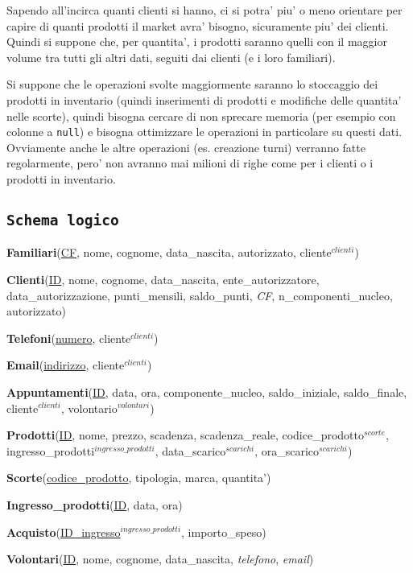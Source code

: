 \documentclass[]{article}
\begin{document}
Sapendo all'incirca quanti clienti si hanno, ci si potra' piu' o meno
orientare per capire di quanti prodotti il market avra' bisogno,
sicuramente piu' dei clienti. Quindi si suppone che, per quantita', i
prodotti saranno quelli con il maggior volume tra tutti gli altri dati,
seguiti dai clienti (e i loro familiari).

Si suppone che le operazioni svolte maggiormente saranno lo stoccaggio
dei prodotti in inventario (quindi inserimenti di prodotti e modifiche
delle quantita' nelle scorte), quindi bisogna cercare di non sprecare
memoria (per esempio con colonne a \texttt{null}) e bisogna ottimizzare
le operazioni in particolare su questi dati. Ovviamente anche le altre
operazioni (es. creazione turni) verranno fatte regolarmente, pero' non
avranno mai milioni di righe come per i clienti o i prodotti in
inventario.

\hypertarget{schema-logico}{%
\subsection{\texorpdfstring{\texttt{Schema\ logico}}{Schema logico}}\label{schema-logico}}

\textbf{Familiari}(\underline{CF}, nome, cognome, data\_nascita,
autorizzato, cliente\(^{clienti}\))

\textbf{Clienti}(\underline{ID}, nome, cognome, data\_nascita,
ente\_autorizzatore, data\_autorizzazione, punti\_mensili, saldo\_punti,
\emph{CF}, n\_componenti\_nucleo, autorizzato)

\textbf{Telefoni}(\underline{numero}, cliente\(^{clienti}\))

\textbf{Email}(\underline{indirizzo}, cliente\(^{clienti}\))

\textbf{Appuntamenti}(\underline{ID}, data, ora, componente\_nucleo,
saldo\_iniziale, saldo\_finale, cliente\(^{clienti}\),
volontario\(^{volontari}\))

\textbf{Prodotti}(\underline{ID}, nome, prezzo, scadenza,
scadenza\_reale, codice\_prodotto\(^{scorte}\),
ingresso\_prodotti\(^{ingresso\_prodotti}\),
data\_scarico\(^{scarichi}\), ora\_scarico\(^{scarichi}\))

\textbf{Scorte}(\underline{codice\_prodotto}, tipologia, marca,
quantita')

\textbf{Ingresso\_prodotti}(\underline{ID}, data, ora)

\textbf{Acquisto}(\underline{ID\_ingresso$^{ingresso\_prodotti}$},
importo\_speso)

\textbf{Volontari}(\underline{ID}, nome, cognome, data\_nascita,
\emph{telefono}, \emph{email})
\end{document}

